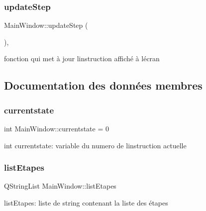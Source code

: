 \subsubsection{\texorpdfstring{update\+Step}{updateStep}}
{\footnotesize\ttfamily Main\+Window\+::update\+Step (\begin{DoxyParamCaption}{ }\end{DoxyParamCaption})\hspace{0.3cm}{\ttfamily [private]}, {\ttfamily [slot]}}



fonction qui met à jour l\textquotesingle{}instruction affiché à l\textquotesingle{}écran 



\subsection{Documentation des données membres}
\mbox{\label{classMainWindow_aa7fb75eed49d7eaa019f64577fa11b05}} 
\subsubsection{\texorpdfstring{currentstate}{currentstate}}
{\footnotesize\ttfamily int Main\+Window\+::currentstate = 0\hspace{0.3cm}{\ttfamily [private]}}

int currentstate\+: variable du numero de l\textquotesingle{}instruction actuelle \mbox{\label{classMainWindow_a1290f4c9df65fb27c870753aa2b24a88}} 
\subsubsection{\texorpdfstring{list\+Etapes}{listEtapes}}
{\footnotesize\ttfamily Q\+String\+List Main\+Window\+::list\+Etapes\hspace{0.3cm}{\ttfamily [private]}}

list\+Etapes\+: liste de string contenant la liste des étapes \mbox{\label{classMainWindow_af5f0afb6c5f81e4438f98f93f918ea8b}} 
